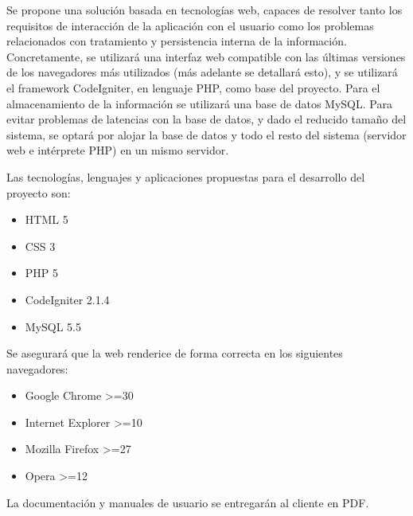 Se propone una solución basada en tecnologías web, capaces de resolver tanto los requisitos de interacción de la aplicación con el usuario como los problemas relacionados con tratamiento y persistencia interna de la información.
Concretamente, se utilizará una interfaz web compatible con las últimas versiones de los navegadores más utilizados (más adelante se detallará esto), y se utilizará el framework CodeIgniter, en lenguaje PHP, como base del proyecto. Para el almacenamiento de la información se utilizará una base de datos MySQL.
Para evitar problemas de latencias con la base de datos, y dado el reducido tamaño del sistema, se optará por alojar la base de datos y todo el resto del sistema (servidor web e intérprete PHP) en un mismo servidor.

Las tecnologías, lenguajes y aplicaciones propuestas para el desarrollo del proyecto son:

\begin{itemize}
\item HTML 5
\item CSS 3
\item PHP 5
\item CodeIgniter 2.1.4
\item MySQL 5.5
\end{itemize}

Se asegurará que la web renderice de forma correcta en los siguientes navegadores:

\begin{itemize}
\item Google Chrome >=30
\item Internet Explorer >=10
\item Mozilla Firefox >=27
\item Opera >=12
\end{itemize}

La documentación y manuales de usuario se entregarán al cliente en PDF.

